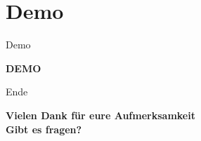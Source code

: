 \documentclass[19pt]{beamer}
\begin{document}
\section{Demo}
\begin{frame}{Demo}
	\begin{center}
		\textbf{DEMO}
	\end{center}
\end{frame}


\begin{frame}{Ende}
	\begin{center}
		\textbf{Vielen Dank f\"{u}r eure Aufmerksamkeit} \\
		\textbf{Gibt es fragen?}
	\end{center}
\end{frame}
\end{document}
